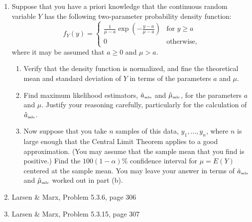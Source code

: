 \documentclass [12pt] {article}
\begin{document}
\begin{enumerate}
\item Suppose that you have a priori knowledge that the continuous random variable $Y$ has the following two-parameter probability density function:
\[
f_Y(y) = \left\{
\begin{array}{ll}
\frac{1}{\mu-a}\exp\left(-\frac{y-a}{\mu-a}\right) & \mbox{for $y\geq a$}\\
0 & \mbox{otherwise,}
\end{array}
\right.
\]
where it may be assumed that $a \geq 0$ and $\mu>a$.
	\begin{enumerate}
	\item Verify that the density function is normalized, and fine the theoretical mean and standard deviation of $Y$ in terms of the parameters $a$ and $\mu$.
	\item Find maximum likelihood estimators, $\hat{a}_{\mbox{\tiny mle}}$ and $\hat{\mu}_{\mbox{\tiny mle}}$, for the parameters $a$ and $\mu$.  Justify your reasoning carefully, particularly for the calculation of $\hat{a}_{\mbox{\tiny mle}}$.
	\item Now suppose that you take $n$ samples of this data, $y_1,\ldots,y_n$, where $n$ is large enough that the Central Limit Theorem applies to a good approximation.  (You may assume that the sample mean that you find is positive.)  Find the $100(1-\alpha)\%$  confidence interval for $\mu = E(Y)$ centered at the sample mean.  You may leave your answer in terms of $\hat{a}_{\mbox{\tiny mle}}$ and $\hat{\mu}_{\mbox{\tiny mle}}$ worked out in part (b).
	\end{enumerate}

\item Larsen \& Marx, Problem 5.3.6, page 306

\item Larsen \& Marx, Problem 5.3.15, page 307

\end{enumerate}
\end{document}
